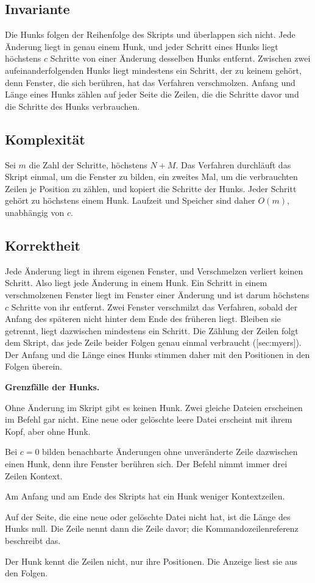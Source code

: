 \subsection{Invariante}

Die Hunks folgen der Reihenfolge des Skripts und überlappen sich nicht. Jede Änderung liegt in
genau einem Hunk, und jeder Schritt eines Hunks liegt höchstens $c$ Schritte von einer Änderung
desselben Hunks entfernt. Zwischen zwei aufeinanderfolgenden Hunks liegt mindestens ein Schritt,
der zu keinem gehört, denn Fenster, die sich berühren, hat das Verfahren verschmolzen. Anfang und
Länge eines Hunks zählen auf jeder Seite die Zeilen, die die Schritte davor und die Schritte des
Hunks verbrauchen.

\subsection{Komplexität}

Sei $m$ die Zahl der Schritte, höchstens $N+M$. Das Verfahren durchläuft das Skript einmal, um die
Fenster zu bilden, ein zweites Mal, um die verbrauchten Zeilen je Position zu zählen, und kopiert
die Schritte der Hunks. Jeder Schritt gehört zu höchstens einem Hunk. Laufzeit und Speicher sind
daher $O(m)$, unabhängig von $c$.

\subsection{Korrektheit}

Jede Änderung liegt in ihrem eigenen Fenster, und Verschmelzen verliert keinen Schritt. Also liegt
jede Änderung in einem Hunk. Ein Schritt in einem verschmolzenen Fenster liegt im Fenster einer
Änderung und ist darum höchstens $c$ Schritte von ihr entfernt. Zwei Fenster verschmilzt das
Verfahren, sobald der Anfang des späteren nicht hinter dem Ende des früheren liegt. Bleiben sie
getrennt, liegt dazwischen mindestens ein Schritt. Die Zählung der Zeilen folgt dem Skript, das
jede Zeile beider Folgen genau einmal verbraucht ([sec:myers]). Der Anfang und die
Länge eines Hunks stimmen daher mit den Positionen in den Folgen überein.

\startinfobox
{\bf Grenzfälle der Hunks.}
\startitemize
\item Ohne Änderung im Skript gibt es keinen Hunk. Zwei gleiche Dateien erscheinen im Befehl gar
nicht. Eine neue oder gelöschte leere Datei erscheint mit ihrem Kopf, aber ohne Hunk.
\item Bei $c = 0$ bilden benachbarte Änderungen ohne unveränderte Zeile dazwischen einen Hunk,
denn ihre Fenster berühren sich. Der Befehl  nimmt immer drei Zeilen Kontext.
\item Am Anfang und am Ende des Skripts hat ein Hunk weniger Kontextzeilen.
\item Auf der Seite, die eine neue oder gelöschte Datei nicht hat, ist die Länge des Hunks null.
Die Zeile  nennt dann die Zeile davor; die Kommandozeilenreferenz beschreibt das.
\item Der Hunk kennt die Zeilen nicht, nur ihre Positionen. Die Anzeige liest sie aus den Folgen.
\stopitemize
\stopinfobox

